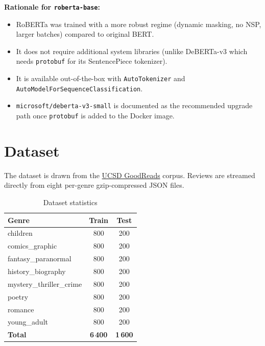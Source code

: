 \documentclass[12pt,a4paper]{article}
\begin{document}
\textbf{Rationale for \texttt{roberta-base}:}
\begin{itemize}
    \item RoBERTa was trained with a more robust regime (dynamic masking, no NSP,
          larger batches) compared to original BERT.
    \item It does not require additional system libraries (unlike DeBERTa-v3 which
          needs \texttt{protobuf} for its SentencePiece tokenizer).
    \item It is available out-of-the-box with \texttt{AutoTokenizer} and
          \texttt{AutoModelForSequenceClassification}.
    \item \texttt{microsoft/deberta-v3-small} is documented as the recommended
          upgrade path once \texttt{protobuf} is added to the Docker image.
\end{itemize}

\section{Dataset}

The dataset is drawn from the
\href{https://mengtingwan.github.io/data/goodreads.html}{UCSD GoodReads} corpus.
Reviews are streamed directly from eight per-genre gzip-compressed JSON files.

\begin{table}[h]
\centering
\caption{Dataset statistics}
\begin{tabular}{lcc}
\toprule
\textbf{Genre}             & \textbf{Train} & \textbf{Test} \\
\midrule
children                   & 800 & 200 \\
comics\_graphic            & 800 & 200 \\
fantasy\_paranormal        & 800 & 200 \\
history\_biography         & 800 & 200 \\
mystery\_thriller\_crime   & 800 & 200 \\
poetry                     & 800 & 200 \\
romance                    & 800 & 200 \\
young\_adult               & 800 & 200 \\
\midrule
\textbf{Total}             & \textbf{6\,400} & \textbf{1\,600} \\
\bottomrule
\end{tabular}
\end{table}
\end{document}
